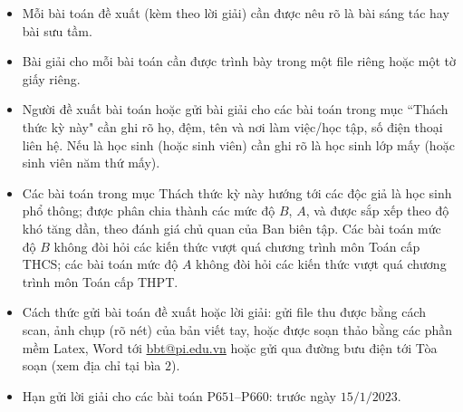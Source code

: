 \thispagestyle{thachthuctoanhocnone}
\pagestyle{thachthuctoanhoc}
\everymath{\color{thachthuctoanhoc}}
\graphicspath{{../thachthuctoanhoc/pic/}}
\begingroup
{}
\centering
\vspace*{4cm}
\endgroup
\vspace*{-8pt}
\begin{tBox}
	\begin{itemize}[leftmargin = 13pt, itemsep = 1.0pt] 
		\item Mỗi bài toán đề xuất (kèm theo lời giải) cần được nêu rõ là bài sáng tác hay bài sưu tầm.
		\item Bài giải cho mỗi bài toán cần được trình bày trong một file riêng hoặc
		một tờ giấy riêng.
		\item  Người đề xuất bài toán hoặc gửi bài giải cho các bài toán trong mục ``Thách thức kỳ này" cần ghi rõ họ, đệm, tên và nơi làm việc/học tập, số điện thoại liên hệ. Nếu là học sinh (hoặc sinh viên) cần ghi rõ là học sinh lớp mấy (hoặc sinh viên năm thứ mấy).
		\item Các bài toán trong mục Thách thức kỳ này hướng tới các độc giả là học sinh phổ thông; được phân chia thành các mức độ $B$, $A$, và được sắp xếp theo độ khó tăng dần, theo đánh giá chủ quan của Ban biên tập. Các bài toán mức độ $B$ không đòi hỏi các kiến thức vượt quá chương trình môn Toán cấp THCS; các bài toán mức độ $A$ không đòi hỏi các kiến thức vượt quá chương trình môn Toán cấp THPT.
		\item Cách thức gửi bài toán đề xuất hoặc lời giải: gửi file thu được bằng cách scan, ảnh chụp (rõ nét) của bản viết tay, hoặc được soạn thảo bằng các phần mềm Latex, Word tới \url{bbt@pi.edu.vn} hoặc gửi qua đường bưu điện tới Tòa soạn (xem địa chỉ tại bìa $2$).
		\item Hạn gửi lời giải cho các bài toán P$651$--P$660$: trước ngày $15/1/2023$.
	\end{itemize}
\end{tBox}
